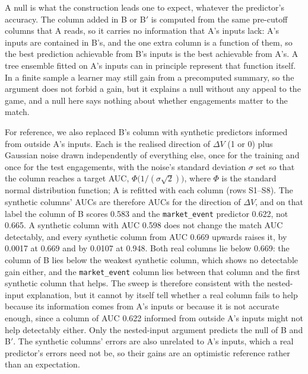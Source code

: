 A null is what the construction leads one to expect, whatever the predictor's accuracy. The column added
in B or B$'$ is computed from the same pre-cutoff columns that A reads, so it carries no information that
A's inputs lack: A's inputs are contained in B's, and the one extra column is a function of them, so the
best prediction achievable from B's inputs is the best achievable from A's. A tree ensemble fitted on A's
inputs can in principle represent that function itself. In a finite sample a learner may still gain from
a precomputed summary, so the argument does not forbid a gain, but it explains a null without any
appeal to the game, and a null here says nothing about whether engagements matter to the match.

For reference, we also replaced B's column with synthetic predictors informed from outside A's inputs.
Each is the realised direction of $\Delta V$ (1 or 0) plus Gaussian noise drawn independently of
everything else, once for the training and once for the test engagements, with the noise's standard
deviation $\sigma$ set so that the column reaches a target AUC, $\Phi\big(1/(\sigma\sqrt{2})\big)$, where
$\Phi$ is the standard normal distribution function; A is refitted with each column (rows S1--S8). The
synthetic columns' AUCs are therefore AUCs for the direction of $\Delta V$, and on that label the column of
B scores 0.583 and the \texttt{market\_event} predictor 0.622, not 0.665. A synthetic column with AUC 0.598
does not change the match AUC detectably, and every synthetic column from AUC 0.669 upwards raises it, by
0.0017 at 0.669 and by 0.0107 at 0.948. Both real columns lie below 0.669: the column of B lies below the
weakest synthetic column, which shows no detectable gain either, and the \texttt{market\_event} column lies
between that column and the first synthetic column that helps. The sweep is therefore consistent with the
nested-input explanation, but it cannot by itself tell whether a real column fails to help because its
information comes from A's inputs or because it is not accurate enough, since a column of AUC 0.622
informed from outside A's inputs might not help detectably either. Only the nested-input argument
predicts the null of B and B$'$. The synthetic columns' errors are also unrelated to
A's inputs, which a real predictor's errors need not be, so their gains are an optimistic reference rather
than an expectation.
